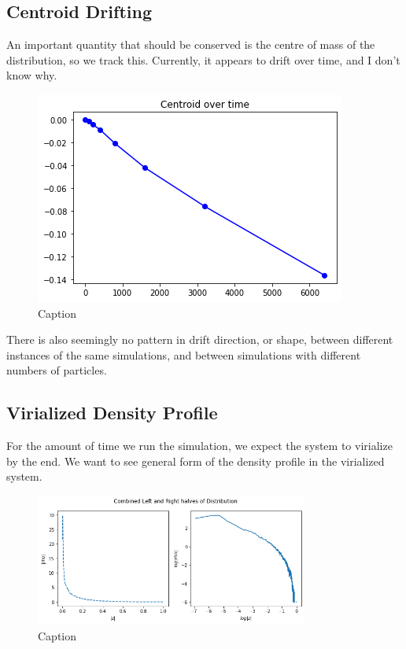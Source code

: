 \documentclass[oneside]{book}
\begin{document}
\subsection{Centroid Drifting}
An important quantity that should be conserved is the centre of mass of the distribution, so we track this. {\color{red}Currently, it appears to drift over time, and I don't know why}.
\begin{figure}[h]
    \centering
    \includegraphics[scale = 0.75]{Images/Centroid.png}
    \caption{Caption}
    \label{Centroid Drift}
\end{figure}
There is also seemingly no pattern in drift direction, or shape, between different instances of the same simulations, and between simulations with different numbers of particles.

\subsection{Virialized Density Profile}
For the amount of time we run the simulation, we expect the system to virialize by the end. We want to see general form of the density profile in the virialized system.
\begin{figure}[h]
    \centering
    \includegraphics[width = 0.8\textwidth]{Images/DensityProfile.png}
    \caption{Caption}
    \label{Density Profile}
\end{figure}
\end{document}
